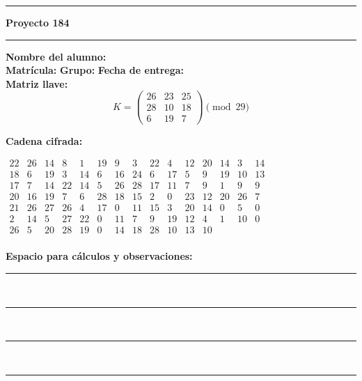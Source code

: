 \documentclass{article}%
\begin{document}
\bigskip
\hrule
\bigskip%

\textbf{Proyecto 184}\\[2pt]
\hrule
\bigskip

\textbf{Nombre del alumno:} \underline{\hspace{8cm}}\\[8pt]
\textbf{Matrícula:} \underline{\hspace{4cm}} \hspace{1cm}
\textbf{Grupo:} \underline{\hspace{2cm}} \hspace{1cm}
\textbf{Fecha de entrega:} \underline{\hspace{2.5cm}}\\[12pt]

\textbf{Matriz llave:}
\[
K = \begin{pmatrix}
26 & 23 & 25 \\
28 & 10 & 18 \\
6 & 19 & 7
\end{pmatrix} \pmod{29}
\]

\textbf{Cadena cifrada:}
\begin{center}
$\begin{array}{lllllllllllllll}
22 & 26 & 14 & 8 & 1 & 19 & 9 & 3 & 22 & 4 & 12 & 20 & 14 & 3 & 14\\
18 & 6 & 19 & 3 & 14 & 6 & 16 & 24 & 6 & 17 & 5 & 9 & 19 & 10 & 13\\
17 & 7 & 14 & 22 & 14 & 5 & 26 & 28 & 17 & 11 & 7 & 9 & 1 & 9 & 9\\
20 & 16 & 19 & 7 & 6 & 28 & 18 & 15 & 2 & 0 & 23 & 12 & 20 & 26 & 7\\
21 & 26 & 27 & 26 & 4 & 17 & 0 & 11 & 15 & 3 & 20 & 14 & 0 & 5 & 0\\
2 & 14 & 5 & 27 & 22 & 0 & 11 & 7 & 9 & 19 & 12 & 4 & 1 & 10 & 0\\
26 & 5 & 20 & 28 & 19 & 0 & 14 & 18 & 28 & 10 & 13 & 10\\
\end{array}$
\end{center}

\bigskip
\textbf{Espacio para cálculos y observaciones:}\\[6pt]
\rule{\linewidth}{0.4pt}\\[10pt]
\rule{\linewidth}{0.4pt}\\[10pt]
\rule{\linewidth}{0.4pt}\\[10pt]
\rule{\linewidth}{0.4pt}\\[10pt]
%
\end{document}
